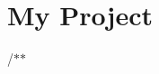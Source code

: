 \chapter{My Project}
\hypertarget{index}{}\label{index}
\label{index_md_README}%
%
 /\texorpdfstring{$\ast$}{*}\texorpdfstring{$\ast$}{*}
\begin{DoxyItemize}
\item 
\end{DoxyItemize}
